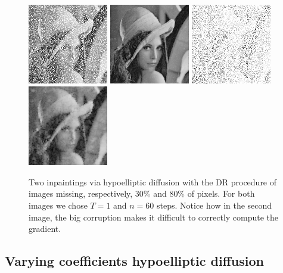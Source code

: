 \documentclass[proc]{edpsmath}
\begin{document}
\begin{figure}
  \includegraphics[height = 3.5cm]{imgs/lena-random-30}
  \includegraphics[height = 3.5cm]{imgs/lena-random-30-mask}\qquad
  \includegraphics[height = 3.5cm]{imgs/lena-random-80}
  \includegraphics[height = 3.5cm]{imgs/lena-random-80-mask}
  \caption{Two inpaintings via {hypoelliptic diffusion with} the DR procedure of images missing, respectively, 30\% and 80\% of pixels. For both images we chose $T=1$ and $n=60$ steps. Notice how in the second image, the big corruption makes it difficult to correctly compute the gradient.}
  \label{fig:masking-highly}
\end{figure}




\subsection{Varying coefficients hypoelliptic diffusion}\label{sec:varying}
\end{document}

